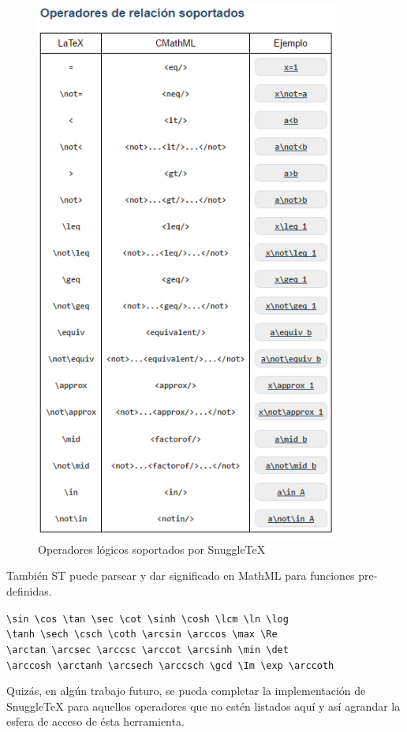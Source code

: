 \begin{figure}[H]
\centering
  \includegraphics[width=10cm, height=17.84cm]{Figures/reloperatorsoportados}
  \caption[]{Operadores lógicos soportados por SnuggleTeX}
\label{fig:opsoportados}
\end{figure}

También ST puede parsear y dar significado en MathML para funciones pre-definidas.

\begin{tcolorbox}
\verb|\sin \cos \tan \sec \cot \sinh \cosh \lcm \ln \log|\\
\verb|\tanh \sech \csch \coth \arcsin \arccos \max \Re| \\
\verb|\arctan \arcsec \arccsc \arccot \arcsinh \min \det|\\
\verb|\arccosh \arctanh \arcsech \arccsch \gcd \Im \exp \arccoth|
\end{tcolorbox}

Quizás, en algún trabajo futuro, se pueda completar la implementación de SnuggleTeX para aquellos operadores que no estén listados aquí y así agrandar la esfera de acceso de ésta herramienta.

